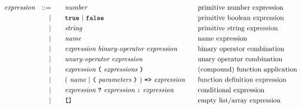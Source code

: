 \begin{alignat*}{9}
&& \textit{expression}   && ::= &\quad &&  \textit{number}   && \textrm{primitive number expression}\\
&&                       && |   &\quad && \textbf{\texttt{true}}\ |\ \textbf{\texttt{false}}
                                                           && \textrm{primitive boolean expression}\\
&&                       && |   &\quad &&  \textit{string}   && \textrm{primitive string expression}\\
&&                       && |   &\quad &&  \textit{name}   && \textrm{name expression}\\
&&                       && |   &\quad &&  \textit{expression} \  \textit{binary-operator} \ 
                                            \textit{expression} \qquad
                                                           && \textrm{binary operator combination}\\
&&                       && |   &\quad &&   \textit{unary-operator} \ 
                                            \textit{expression}
                                                           && \textrm{unary operator combination}\\
&&                       && |   &\quad &&   \textit{expression} \ 
                                            \textbf{\texttt{(}}\ \textit{expressions}\
                                            \textbf{\texttt{)}}
                                                           && \textrm{(compound) function application}\\
&&                       && |   &\quad &&   (\ \textit{name}\ | \
                                               \textbf{\texttt{(}}\ \textit{parameters}\ \textbf{\texttt{)}}\
                                            )\    
                                            \texttt{\textbf{=>}}\ \textit{expression}
                                                           && \textrm{function definition expression}\\
&&                       && |   &\quad &&   \textit{expression} \ \textbf{\texttt{?}}\ 
                                            \textit{expression}
                                            \ \textbf{\texttt{:}}\
                                            \textit{expression}\
                                                           && \textrm{conditional expression}\\
&&                       && |   &\quad &&   \textbf{\texttt{[]}}
                                                           && \textrm{empty list/array expression}\\

\end{alignat*}
